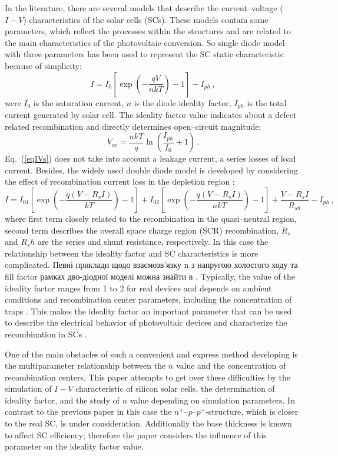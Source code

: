 ﻿\documentclass[12pt]{article}
\begin{document}
In the literature, there are several models that describe the current--voltage ($I-V$) characteristics of the solar cells (SCs).
These models contain some parameters, which reflect the processes within the structures and are related to the main characteristics of the photovoltaic conversion.
So single diode model with three parameters has been used to represent the SC static characteristic because of simplicity:
\begin{equation}
\label{eqIVs}
    I=I_{0}\left[\exp\left(-\frac{qV}{nkT}\right)-1\right]-I_{ph}\,,
\end{equation}
were
$I_0$ is the saturation current,
$n$ is the diode ideality factor,
$I_{ph}$ is the total current generated by solar cell.
The ideality factor value indicates about a defect related recombination and directly determines open--circuit magnitude:
\begin{equation}
\label{eqVoc}
    V_{oc}=\frac{nkT}{q}\ln\left(\frac{I_{ph}}{I_0}+1\right)\,.
\end{equation}
Eq.~(\ref{eqIVs}) does not take into account a leakage current, a series losses of load current.
Besides, the widely used double diode model is developed by considering the effect of recombination current loss
in the depletion region \cite{2Diod:Ishaque,2Diod:Buhler,Breitenstein2013}:
\begin{equation}
\label{eqIVd}
    I=I_{01}\left[\exp\left(-\frac{q(V-R_sI)}{kT}\right)-1\right]
      + I_{02}\left[\exp\left(-\frac{q(V-R_sI)}{nkT}\right)-1\right]
      +\frac{V-R_sI}{R_{sh}}
      -I_{ph}\,,
\end{equation}
where
first term closely related to the recombination in the quasi--neutral region,
second term describes the overall space charge region (SCR) recombination,
$R_s$ and $R_sh$ are the series and shunt resistance, respectively.
In this case the relationship between the ideality factor and SC characteristics is more complicated.
Певні приклади щодо взаємозв'язку n з напругою холостого ходу та fill factor  рамках дво-діодної моделі можна знайти в \cite{Olikh2018SM}.
Typically, the value of the ideality factor ranges from 1 to 2 for real devices and depends on ambient conditions and recombination center parameters,
including the concentration of traps \cite{n2_Beier,n2McIntosh,n2Kaminski,HAMEIRI2013251,Heide}.
This makes the ideality factor an important parameter that can be used to describe the electrical behavior of photovoltaic devices and characterize the recombination in SCs \cite{Duan}.

One of the main obstacles of such a convenient and express method developing is the multiparameter relationship between
the $n$ value and the concentration of recombination centers.
This paper attempts to get over these difficulties by the simulation of $I-V$ characteristic of silicon solar cells,
the determination of ideality factor, and the study of  $n$ value depending on simulation parameters.
In contrast to the previous paper \cite{Olikh2019SM} in this case the $n^+$--$p$--$p^+$-structure,
which is closer to the real SC, is under consideration.
Additionally the base thickness is known \cite{Sach_d,FeB:Schmidt} to affect SC efficiency;
therefore the paper considers the influence of this parameter on the ideality factor value.
\end{document}

